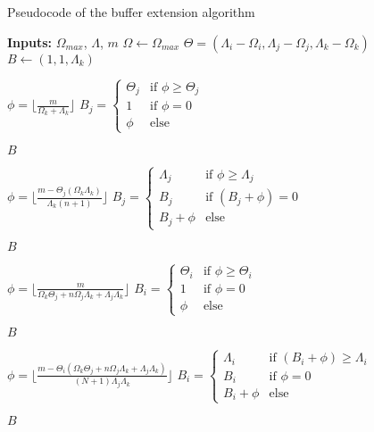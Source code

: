 \documentclass[conference]{IEEEtran}
\begin{document}
\begin{algorithm}
  \caption{Pseudocode of the buffer extension algorithm}
  \label{algo:bufferextensionalgorihm}
  \begin{algorithmic}[1]
    \STATE \textbf{Inputs:} $\Omega_{max}$, $\Lambda$, $m$
    \STATE $\Omega \leftarrow \Omega_{max}$
    \STATE $\Theta = (\Lambda_i - \Omega_i, \Lambda_j - \Omega_j, \Lambda_k - \Omega_k)$
    \STATE $B \leftarrow (1,1,\Lambda_k)$

    \STATE $\phi = \lfloor \frac{m}{\Omega_k + \Lambda_k} \rfloor$
    \STATE $B_j = \begin{cases}
      \Theta_j & \textrm{if }\phi \geq \Theta_j \\
      1 & \textrm{if }\phi = 0 \\
      \phi & \textrm{else}
    \end{cases}$

      \RETURN $B$
    \ENDIF

    \STATE $\phi = \lfloor \frac{m-\Theta_j(\Omega_k\Lambda_k)}{\Lambda_k(n+1)} \rfloor$
    \STATE $B_j = \begin{cases}
      \Lambda_j & \textrm{if }\phi \geq \Lambda_j \\
      B_j & \textrm{if }(B_j+\phi) = 0 \\
      B_j + \phi & \textrm{else}
    \end{cases}$

      \RETURN $B$
    \ENDIF

    \STATE $\phi = \lfloor \frac{m}{\Omega_k\Theta_j + n\Omega_j\Lambda_k + \Lambda_j\Lambda_k} \rfloor$
    \STATE $B_i = \begin{cases}
      \Theta_i & \textrm{if }\phi \geq \Theta_i \\
      1 & \textrm{if }\phi = 0 \\
      \phi & \textrm{else}
    \end{cases}$

      \RETURN $B$
    \ENDIF

    \STATE $\phi = \lfloor \frac{m-\Theta_i(\Omega_k\Theta_j + n\Omega_j\Lambda_k + \Lambda_j\Lambda_k)}{(N+1)\Lambda_j\Lambda_k} \rfloor$
    \STATE $B_i = \begin{cases}
      \Lambda_i & \textrm{if }(B_i+\phi) \geq \Lambda_i \\
      B_i & \textrm{if }\phi = 0 \\
      B_i+\phi & \textrm{else}
    \end{cases}$

    \RETURN $B$

  \end{algorithmic}
\end{algorithm}
\end{document}
